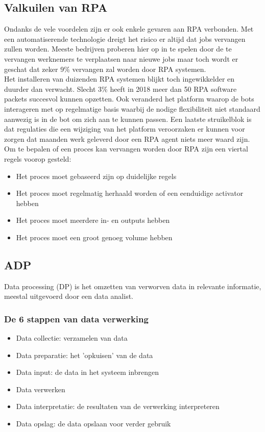 \subsection{Valkuilen van RPA}
Ondanks de vele voordelen zijn er ook enkele gevaren aan RPA verbonden. Met een automatiserende technologie dreigt het risico er altijd dat jobs vervangen zullen worden. Meeste bedrijven proberen hier op in te spelen door de te vervangen werknemers te verplaatsen naar nieuwe jobs maar toch wordt er geschat dat zeker 9\% vervangen zal worden door RPA systemen.\\
Het installeren van duizenden RPA systemen blijkt toch ingewikkelder en duurder dan verwacht. Slecht 3\% heeft in 2018 meer dan 50 RPA software packets succesvol kunnen opzetten. Ook veranderd het platform waarop de bots interageren met op regelmatige basis waarbij de nodige flexibiliteit niet standaard aanwezig is in de bot om zich aan te kunnen passen. Een laatste struikelblok is dat regulaties die een wijziging van het platform veroorzaken er kunnen voor zorgen dat maanden werk geleverd door een RPA agent niets meer waard zijn. \autocite{whatIsRPA}\\

Om te bepalen of een proces kan vervangen worden door RPA zijn een viertal regels voorop gesteld:
\begin{itemize}
	\item Het proces moet gebaseerd zijn op duidelijke regels
	\item Het proces moet regelmatig herhaald worden of een eenduidige activator hebben
	\item Het proces moet meerdere in- en outputs hebben
	\item Het proces moet een groot genoeg volume hebben
\end{itemize} \autocite{explainRPA}

\subsection{ADP}
Data processing (DP) is het omzetten van verworven data in relevante informatie, meestal uitgevoerd door een data analist. \autocite{whatIsDP}

\subsubsection{De 6 stappen van data verwerking}
\begin{itemize}
	\item Data collectie: verzamelen van data
	\item Data preparatie: het 'opkuisen' van de data
	\item Data input: de data in het systeem inbrengen
	\item Data verwerken
	\item Data interpretatie: de resultaten van de verwerking interpreteren
	\item Data opslag: de data opslaan voor verder gebruik
\end{itemize}  \autocite{whatIsDP}

